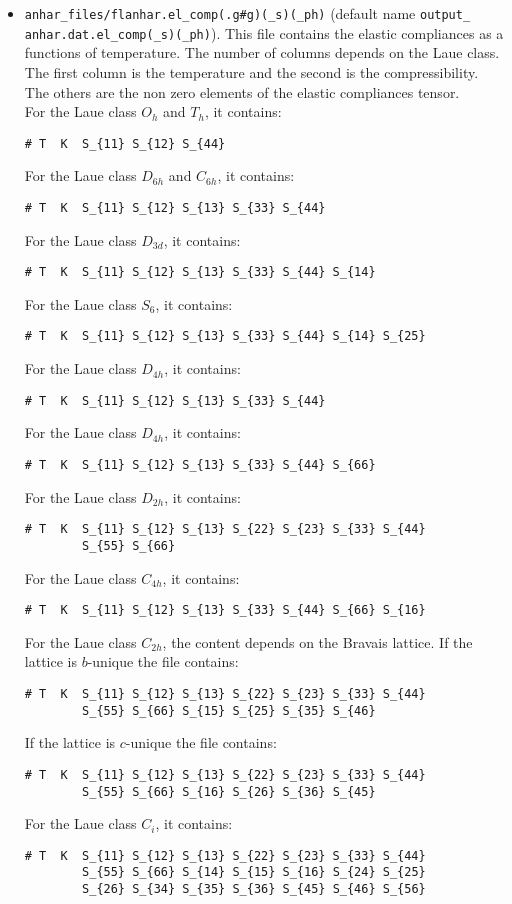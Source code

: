 \documentclass[12pt,a4paper,twoside]{report}
\begin{document}
\begin{itemize}
\item
\texttt{anhar\_files/flanhar.el\_comp(.g\#g)(\_s)(\_ph)}
(default name \texttt{output\_} \texttt{anhar.dat.el\_comp(\_s)(\_ph)}). 
This file
contains the elastic compliances as a functions of temperature. 
The number of columns depends on the Laue class. The first column is the 
temperature and the second is the compressibility. The others are the
non zero elements of the elastic compliances tensor. \\ 
For the Laue class $O_h$ and $T_h$, it contains:
\begin{verbatim}
# T  K  S_{11} S_{12} S_{44}   
\end{verbatim}
For the Laue class $D_{6h}$ and $C_{6h}$, it contains:
\begin{verbatim}
# T  K  S_{11} S_{12} S_{13} S_{33} S_{44}  
\end{verbatim}
For the Laue class $D_{3d}$, it contains:
\begin{verbatim}
# T  K  S_{11} S_{12} S_{13} S_{33} S_{44} S_{14}  
\end{verbatim}
For the Laue class $S_{6}$, it contains:
\begin{verbatim}
# T  K  S_{11} S_{12} S_{13} S_{33} S_{44} S_{14} S_{25}  
\end{verbatim}
For the Laue class $D_{4h}$, it contains:
\begin{verbatim}
# T  K  S_{11} S_{12} S_{13} S_{33} S_{44}
\end{verbatim}
For the Laue class $D_{4h}$, it contains:
\begin{verbatim}
# T  K  S_{11} S_{12} S_{13} S_{33} S_{44} S_{66} 
\end{verbatim}
For the Laue class $D_{2h}$, it contains:
\begin{verbatim}
# T  K  S_{11} S_{12} S_{13} S_{22} S_{23} S_{33} S_{44} 
        S_{55} S_{66}
\end{verbatim}
For the Laue class $C_{4h}$, it contains:
\begin{verbatim}
# T  K  S_{11} S_{12} S_{13} S_{33} S_{44} S_{66} S_{16}  
\end{verbatim}
For the Laue class $C_{2h}$, the content depends on the Bravais lattice. 
If the lattice is $b$-unique the file contains:
\begin{verbatim}
# T  K  S_{11} S_{12} S_{13} S_{22} S_{23} S_{33} S_{44} 
        S_{55} S_{66} S_{15} S_{25} S_{35} S_{46} 
\end{verbatim}
If the lattice is $c$-unique the file contains:
\begin{verbatim}
# T  K  S_{11} S_{12} S_{13} S_{22} S_{23} S_{33} S_{44} 
        S_{55} S_{66} S_{16} S_{26} S_{36} S_{45} 
\end{verbatim}
For the Laue class $C_i$, it contains:
\begin{verbatim}
# T  K  S_{11} S_{12} S_{13} S_{22} S_{23} S_{33} S_{44} 
        S_{55} S_{66} S_{14} S_{15} S_{16} S_{24} S_{25} 
        S_{26} S_{34} S_{35} S_{36} S_{45} S_{46} S_{56}
\end{verbatim}

\end{itemize}
\end{document}
